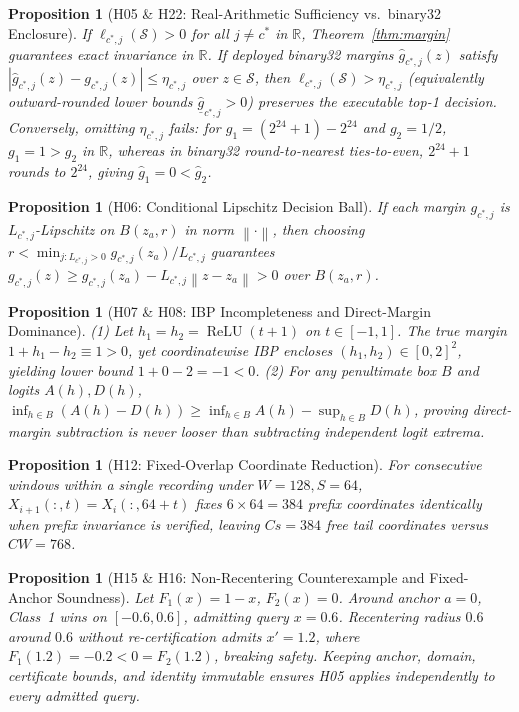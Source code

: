 \documentclass[11pt,oneside,a4paper]{report}
\newcommand{\R}{\mathbb{R}}
\newcommand{\norm}[1]{\left\lVert #1\right\rVert}
\newcommand{\abs}[1]{\left\lvert #1\right\rvert}
\newcommand{\code}[1]{{\small\upshape\ttfamily #1}}
\newcommand{\relu}{\operatorname{ReLU}}
\newcommand{\Sset}{\mathcal{S}}
\newtheorem{proposition}[definition]{Proposition}
\theoremstyle{remark}
\begin{document}
\begin{proposition}[\code{H05} \& \code{H22}: Real-Arithmetic Sufficiency vs.\ \code{binary32} Enclosure]
If $\ell_{c^*,j}(\Sset) > 0$ for all $j \neq c^*$ in $\R$, Theorem~\ref{thm:margin} guarantees exact invariance in $\R$. If deployed \code{binary32} margins $\widehat{g}_{c^*,j}(z)$ satisfy $\abs{\widehat{g}_{c^*,j}(z) - g_{c^*,j}(z)} \le \eta_{c^*,j}$ over $z \in \Sset$, then $\ell_{c^*,j}(\Sset) > \eta_{c^*,j}$ (equivalently outward-rounded lower bounds $\underline{\widehat{g}}_{c^*,j} > 0$) preserves the executable top-1 decision. Conversely, omitting $\eta_{c^*,j}$ fails: for $g_1 = (2^{24}+1) - 2^{24}$ and $g_2 = 1/2$, $g_1 = 1 > g_2$ in $\R$, whereas in \code{binary32} round-to-nearest ties-to-even, $2^{24}+1$ rounds to $2^{24}$, giving $\widehat{g}_1 = 0 < \widehat{g}_2$.
\end{proposition}

\begin{proposition}[\code{H06}: Conditional Lipschitz Decision Ball]
If each margin $g_{c^*,j}$ is $L_{c^*,j}$-Lipschitz on $B(z_a, r)$ in norm $\norm{\cdot}$, then choosing $r < \min_{j : L_{c^*,j} > 0} g_{c^*,j}(z_a) / L_{c^*,j}$ guarantees $g_{c^*,j}(z) \ge g_{c^*,j}(z_a) - L_{c^*,j}\norm{z - z_a} > 0$ over $B(z_a, r)$.
\end{proposition}

\begin{proposition}[\code{H07} \& \code{H08}: IBP Incompleteness and Direct-Margin Dominance]
(1) Let $h_1 = h_2 = \relu(t+1)$ on $t \in [-1,1]$. The true margin $1 + h_1 - h_2 \equiv 1 > 0$, yet coordinatewise IBP encloses $(h_1, h_2) \in [0,2]^2$, yielding lower bound $1 + 0 - 2 = -1 < 0$.
(2) For any penultimate box $B$ and logits $A(h), D(h)$, $\inf_{h \in B}(A(h) - D(h)) \ge \inf_{h \in B} A(h) - \sup_{h \in B} D(h)$, proving direct-margin subtraction is never looser than subtracting independent logit extrema.
\end{proposition}

\begin{proposition}[\code{H12}: Fixed-Overlap Coordinate Reduction]
For consecutive windows within a single recording under $W=128, S=64$, $X_{i+1}(:,t) = X_i(:, 64+t)$ fixes $6 \times 64 = 384$ prefix coordinates identically when prefix invariance is verified, leaving $Cs = 384$ free tail coordinates versus $CW = 768$.
\end{proposition}

\begin{proposition}[\code{H15} \& \code{H16}: Non-Recentering Counterexample and Fixed-Anchor Soundness]
Let $F_1(x) = 1 - x$, $F_2(x) = 0$. Around anchor $a = 0$, Class~1 wins on $[-0.6, 0.6]$, admitting query $x = 0.6$. Recentering radius $0.6$ around $0.6$ without re-certification admits $x' = 1.2$, where $F_1(1.2) = -0.2 < 0 = F_2(1.2)$, breaking safety. Keeping anchor, domain, certificate bounds, and identity immutable ensures \code{H05} applies independently to every admitted query.
\end{proposition}
\end{document}
